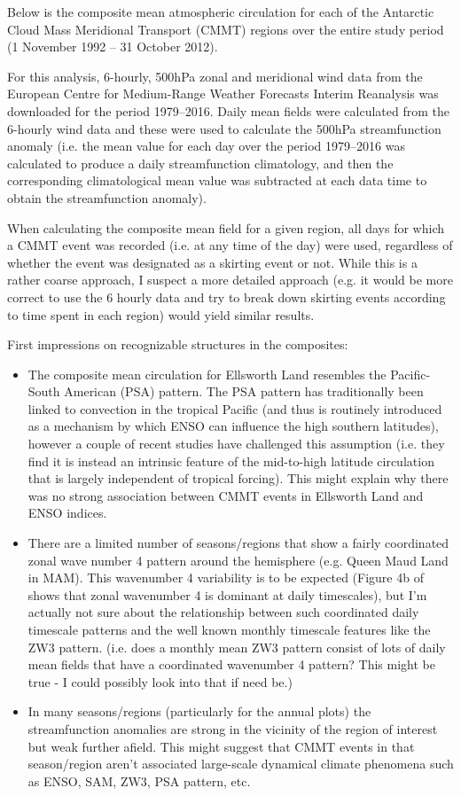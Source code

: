 Below is the composite mean atmospheric circulation for each of the Antarctic Cloud Mass Meridional Transport (CMMT) regions over the entire study period (1 November 1992 -- 31 October 2012).

For this analysis, 6-hourly, 500hPa zonal and meridional wind data from the European Centre for Medium-Range Weather Forecasts Interim Reanalysis \citep[ERA-Interim;][]{Dee2011} was downloaded for the period 1979--2016. Daily mean fields were calculated from the 6-hourly wind data and these were used to calculate the 500hPa streamfunction anomaly (i.e. the mean value for each day over the period 1979--2016 was calculated to produce a daily streamfunction climatology, and then the corresponding climatological mean value was subtracted at each data time to obtain the streamfunction anomaly).   

When calculating the composite mean field for a given region, all days for which a CMMT event was recorded (i.e. at any time of the day) were used, regardless of whether the event was designated as a skirting event or not. While this is a rather coarse approach, I suspect a more detailed approach (e.g. it would be more correct to use the 6 hourly data and try to break down skirting events according to time spent in each region) would yield similar results.

First impressions on recognizable structures in the composites: 
\begin{itemize}
\item The composite mean circulation for Ellsworth Land resembles the Pacific-South American (PSA) pattern. The PSA pattern has traditionally been linked to convection in the tropical Pacific (and thus is routinely introduced as a mechanism by which ENSO can influence the high southern latitudes), however a couple of recent studies \citep{Irving2016,OKane2017} have challenged this assumption (i.e. they find it is instead an intrinsic feature of the mid-to-high latitude circulation that is largely independent of tropical forcing). This might explain why there was no strong association between CMMT events in Ellsworth Land and ENSO indices.
\item There are a limited number of seasons/regions that show a fairly coordinated zonal wave number 4 pattern around the hemisphere (e.g. Queen Maud Land in MAM). This wavenumber 4 variability is to be expected (Figure 4b of \citep{Irving2015} shows that zonal wavenumber 4 is dominant at daily timescales), but I'm actually not sure about the relationship between such coordinated daily timescale patterns and the well known monthly timescale features like the ZW3 pattern. (i.e. does a monthly mean ZW3 pattern consist of lots of daily mean fields that have a coordinated wavenumber 4 pattern? This might be true - I could possibly look into that if need be.)
\item In many seasons/regions (particularly for the annual plots) the streamfunction anomalies are strong in the vicinity of the region of interest but weak further afield. This might suggest that CMMT events in that season/region aren't associated large-scale dynamical climate phenomena such as ENSO, SAM, ZW3, PSA pattern, etc.  
\end{itemize}
